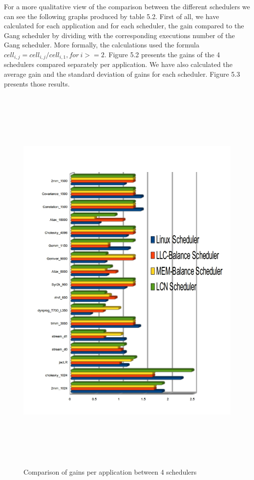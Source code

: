 \documentclass[diploma]{Styles/softlab-thesis}
\begin{document}
\normalsize

For a more qualitative view of the comparison between the different schedulers we can see the following graphs produced by table 5.2. First of all, we have calculated for each application and for each scheduler, the gain compared to the Gang scheduler by dividing with the corresponding executions number of the Gang scheduler. More formally, the calculations used the formula $cell_{i,j}=cell_{i,j}/cell_{i,1}, for \ i>=2$. Figure 5.2 presents the gains of the 4 schedulers compared separately per application. We have also calculated the average gain  and the standard deviation of gains for each scheduler. Figure 5.3 presents those results.

\begin{figure}[ht!]
\begin{center}
\hspace*{-3cm}
\includegraphics[width=200mm, height=200mm]{images/comparison.jpg}
\caption{Comparison of gains per application between 4 schedulers \label{overflow}}
\end{center}
\end{figure}
\end{document}
